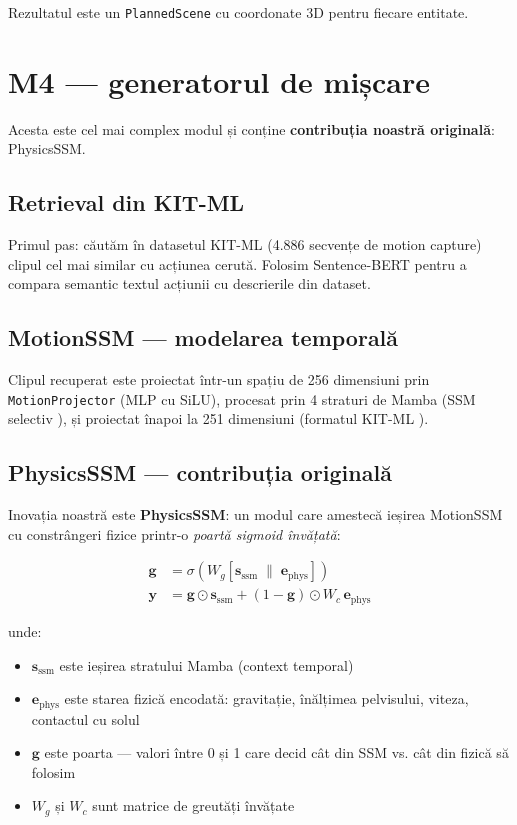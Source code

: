 Rezultatul este un \texttt{PlannedScene} cu coordonate 3D pentru fiecare entitate.

\section{M4 --- generatorul de mișcare}
\label{sec:m4}

Acesta este cel mai complex modul și conține \textbf{contribuția noastră originală}: PhysicsSSM.

\subsection{Retrieval din KIT-ML}

Primul pas: căutăm în datasetul KIT-ML (4.886 secvențe de motion capture) clipul cel mai similar cu acțiunea cerută.  Folosim Sentence-BERT pentru a compara semantic textul acțiunii cu descrierile din dataset.

\subsection{MotionSSM --- modelarea temporală}

Clipul recuperat este proiectat într-un spațiu de 256 dimensiuni prin \texttt{MotionProjector} (MLP cu SiLU), procesat prin 4 straturi de Mamba \cite{gu2023mamba} (SSM selectiv \cite{gu2022s4}), și proiectat înapoi la 251 dimensiuni (formatul KIT-ML \cite{plappert2016kit}).

\subsection{PhysicsSSM --- contribuția originală}

Inovația noastră este \textbf{PhysicsSSM}: un modul care amestecă ieșirea MotionSSM cu constrângeri fizice printr-o \textit{poartă sigmoid învățată}:

\begin{align}
    \mathbf{g} &= \sigma\!\left(W_g [\mathbf{s}_{\text{ssm}} \;\|\; \mathbf{e}_{\text{phys}}]\right) \\
    \mathbf{y} &= \mathbf{g} \odot \mathbf{s}_{\text{ssm}} + (1 - \mathbf{g}) \odot W_c \, \mathbf{e}_{\text{phys}}
\end{align}

unde:
\begin{itemize}
    \item $\mathbf{s}_{\text{ssm}}$ este ieșirea stratului Mamba (context temporal)
    \item $\mathbf{e}_{\text{phys}}$ este starea fizică encodată: gravitație, înălțimea pelvisului, viteza, contactul cu solul
    \item $\mathbf{g}$ este poarta --- valori între 0 și 1 care decid cât din SSM vs. cât din fizică să folosim
    \item $W_g$ și $W_c$ sunt matrice de greutăți învățate
\end{itemize}

